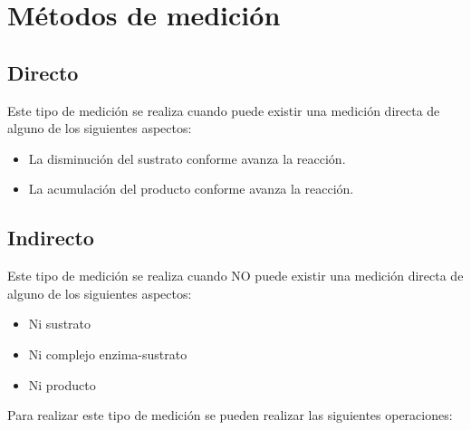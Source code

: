 \section{Métodos de medición}

\subsection{Directo}

Este tipo de medición se realiza cuando puede existir una medición directa de alguno de los siguientes aspectos:

\begin{itemize}
    \item La disminución del sustrato conforme avanza la reacción.
    \item La acumulación del producto conforme avanza la reacción.
\end{itemize}

\subsection{Indirecto}

Este tipo de medición se realiza cuando NO puede existir una medición directa de alguno de los siguientes aspectos:

\begin{itemize}
    \item Ni sustrato
    \item Ni complejo enzima-sustrato
    \item Ni producto
\end{itemize}

Para realizar este tipo de medición se pueden realizar las siguientes operaciones:

